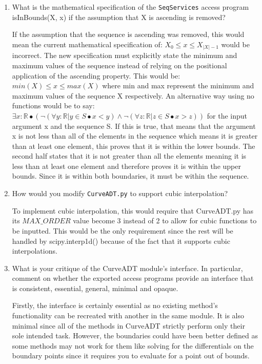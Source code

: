 \documentclass[12pt]{article}
\begin{document}
\begin{enumerate}

\item What is the mathematical specification of the \texttt{SeqServices} access
  program isInBounds(X, x) if the assumption that X is ascending is removed?

If the assumption that the sequence is ascending was removed, this would mean the
current mathematical specification of: $X_0 \leq x \leq X_{|X|-1}$ would be incorrect.
The new specification must explicitly state the minimum and maximum values of the 
sequence instead of relying on the positional application of the ascending property.
This would be: $min(X) \leq x \leq max(X)$ where min and max represent the minimum
and maximum values of the sequence X respectively. An alternative way using no 
functions would be to say: $\exists x:\mathbb{R} \bullet (\neg(\forall y:\mathbb{R}|y \in S \bullet x<y)\land \neg(\forall z:\mathbb{R}|z \in S \bullet x>z))$
for the input argument x and the sequence S. If this is true, that means that the argument
x is not less than all of the elements in the sequence which means it is greater than 
at least one element, this proves that it is within the lower bounds. The second half
states that it is not greater than all the elements meaning it is less than at least
one element and therefore proves it is within the upper bounds. Since it is within
both boundaries, it must be within the sequence.

\item How would you modify \texttt{CurveADT.py} to support cubic interpolation?

To implement cubic interpolation, this would require that CurveADT.py has its 
$MAX\_ORDER$ value become 3 instead of 2 to allow for cubic functions to be inputted. This
would be the only requirement since the rest will be handled by scipy.interp1d()
because of the fact that it supports cubic interpolations. 

\item What is your critique of the CurveADT module's interface.  In particular,
  comment on whether the exported access programs provide an interface that is
  consistent, essential, general, minimal and opaque.

 Firstly, the interface is certainly essential as no existing method's functionality
 can be recreated with another in the same module. It is also minimal since all of
 the methods in CurveADT strictly perform only their sole intended task. However, 
 the boundaries could have been better defined as some methods may not work for them
 like solving for the differentials on the boundary points since it requires you to
 evaluate for a point out of bounds.


\end{enumerate}
\end{document}
